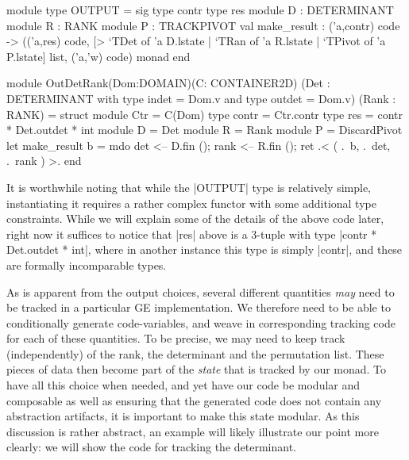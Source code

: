 \documentclass{llncs}
\begin{document}
\begin{small}
\begin{code}
module type OUTPUT = sig
  type contr  type res
  module D : DETERMINANT
  module R : RANK
  module P : TRACKPIVOT
  val make_result : ('a,contr) code -> 
    (('a,res) code,
     [> `TDet of 'a D.lstate | `TRan of 'a R.lstate | `TPivot of 'a P.lstate]
       list,
     ('a,'w) code) monad
end

module OutDetRank(Dom:DOMAIN)(C: CONTAINER2D)
    (Det : DETERMINANT with type indet = Dom.v and type outdet = Dom.v)
    (Rank : RANK) = struct
  module Ctr = C(Dom)
  type contr = Ctr.contr
  type res = contr * Det.outdet * int
  module D = Det
  module R = Rank
  module P = DiscardPivot
  let make_result b = mdo {
    det  <-- D.fin ();
    rank <-- R.fin ();
    ret .< ( .~b, .~det, .~rank ) >. }
end
\end{code}
\end{small}
\noindent It is worthwhile noting that while the |OUTPUT| type is
relatively simple, instantiating it requires a rather complex functor
with some additional type constraints.  While we will explain some of
the details of the above code later, right now it suffices to notice
that |res| above is a 3-tuple with type |contr * Det.outdet * int|,
where in another instance this type is simply |contr|, and these are
formally incomparable types.

As is apparent from the output choices, several different quantities
\emph{may} need to be tracked in a particular GE implementation.
We therefore need to be able to conditionally generate code-variables,
and weave in corresponding tracking code for each of these quantities.
To be precise, we may need to keep track (independently) of the rank,
the determinant and the permutation list.  These pieces of data then
become part of the \emph{state} that is tracked by our monad.  To have
all this choice when needed, and yet have our code be modular and
composable as well as ensuring that the generated code does not 
contain any abstraction artifacts, it is important to make this 
state modular.  As this discussion is rather abstract, an example
will likely illustrate our point more clearly: we will show the 
code for tracking the determinant.
\end{document}
